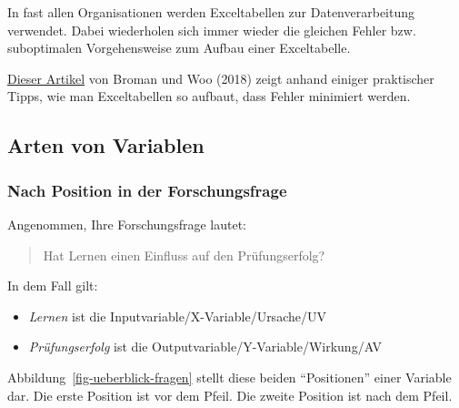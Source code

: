 \documentclass[
  a4paper,
  DIV=11]{scrreprt}
\providecommand{\tightlist}{%
  \setlength{\itemsep}{0pt}\setlength{\parskip}{0pt}}\usepackage{longtable,booktabs,array}
\theoremstyle{definition}
\theoremstyle{definition}
\theoremstyle{remark}
\begin{document}
\begin{tcolorbox}[enhanced jigsaw, titlerule=0mm, bottomrule=.15mm, opacitybacktitle=0.6, colframe=quarto-callout-tip-color-frame, title=\textcolor{quarto-callout-tip-color}{\faLightbulb}\hspace{0.5em}{Tipp}, coltitle=black, colback=white, arc=.35mm, breakable, toptitle=1mm, opacityback=0, bottomtitle=1mm, left=2mm, leftrule=.75mm, rightrule=.15mm, toprule=.15mm, colbacktitle=quarto-callout-tip-color!10!white]

In fast allen Organisationen werden Exceltabellen zur Datenverarbeitung
verwendet. Dabei wiederholen sich immer wieder die gleichen Fehler bzw.
suboptimalen Vorgehensweise zum Aufbau einer Exceltabelle.

\href{https://www.tandfonline.com/doi/full/10.1080/00031305.2017.1375989}{Dieser
Artikel} von Broman und Woo (2018) zeigt anhand einiger praktischer
Tipps, wie man Exceltabellen so aufbaut, dass Fehler minimiert werden.

\end{tcolorbox}

\hypertarget{arten-von-variablen}{%
\subsection{Arten von Variablen}\label{arten-von-variablen}}

\hypertarget{nach-position-in-der-forschungsfrage}{%
\subsubsection{Nach Position in der
Forschungsfrage}\label{nach-position-in-der-forschungsfrage}}

Angenommen, Ihre Forschungsfrage lautet:

\begin{quote}
Hat Lernen einen Einfluss auf den Prüfungserfolg?
\end{quote}

In dem Fall gilt:

\begin{itemize}
\tightlist
\item
  \emph{Lernen} ist die Inputvariable/X-Variable/Ursache/UV
\item
  \emph{Prüfungserfolg} ist die Outputvariable/Y-Variable/Wirkung/AV
\end{itemize}

Abbildung~\ref{fig-ueberblick-fragen} stellt diese beiden ``Positionen''
einer Variable dar. Die erste Position ist vor dem Pfeil. Die zweite
Position ist nach dem Pfeil.
\end{document}
